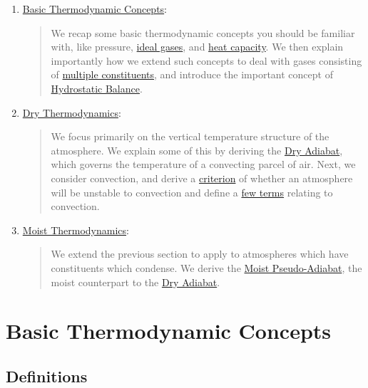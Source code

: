 \begin{enumerate}
    \item \hyperref[Basic Thermodynamics]{Basic Thermodynamic Concepts}: 
        
        \begin{quote}
            We recap some basic thermodynamic concepts you should be familiar with, like pressure, \hyperref[Ideal Gas Box]{ideal gases}, and \hyperref[Equipartition]{heat capacity}. We then explain importantly how we extend such concepts to deal with gases consisting of \hyperref[Multiple]{multiple constituents}, and introduce the important concept of \hyperref[Hydrostatic Box]{Hydrostatic Balance}. 
        \end{quote}

    \item \hyperref[Dry Thermodynamics]{Dry Thermodynamics}: 
    
        \begin{quote}
            We focus primarily on the vertical temperature structure of the atmosphere. We explain some of this by deriving the \hyperref[Dry Adiabat Box]{Dry Adiabat}, which governs the temperature of a convecting parcel of air. Next, we consider convection, and derive a \hyperref[Dry Stability Box]{criterion} of whether an atmosphere will be unstable to convection and define a \hyperref[Convection Box]{few terms} relating to convection. 
        \end{quote}
    
    \item \hyperref[Moist Thermodynamics]{Moist Thermodynamics}:
        
        \begin{quote}
            We extend the previous section to apply to atmospheres which have constituents which condense. We derive the \hyperref[Moist Pseudo Adiabat]{Moist Pseudo-Adiabat}, the moist counterpart to the \hyperref[Dry Adiabat Box]{Dry Adiabat}.
        \end{quote}
\end{enumerate}



\chapter{Basic Thermodynamic Concepts}\label{Basic Thermodynamics}

\section{Definitions}

